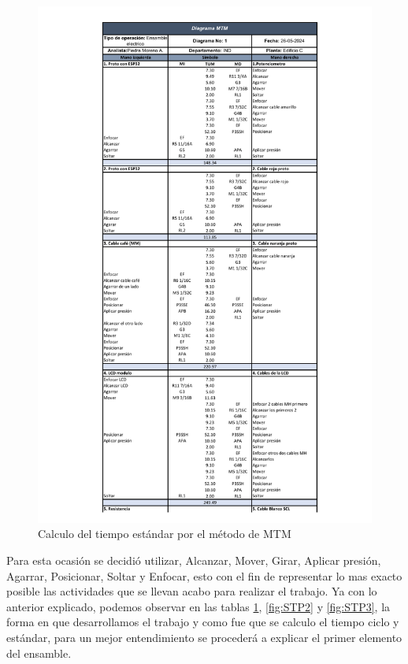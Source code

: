    \begin{figure}[H]
        \centering
        \includegraphics[trim = {20mm 1mm 20mm 1mm},clip,scale=0.3]{22/Img/tiempoEstandarSTP1.pdf}
        \caption{Calculo del tiempo estándar por el método de MTM}
        \label{fig:STP1}
    \end{figure}
    
    
     Para esta ocasión se decidió utilizar, Alcanzar, Mover, Girar, Aplicar presión, Agarrar, Posicionar, Soltar y Enfocar, esto con el fin de representar lo mas exacto posible las actividades que se llevan acabo para realizar el trabajo.
    Ya con lo anterior explicado, podemos observar en las tablas \ref{fig:STP1}, \ref{fig:STP2} y \ref{fig:STP3}, la forma en que desarrollamos el trabajo y como fue que se calculo el tiempo ciclo y estándar, para un mejor entendimiento se procederá a explicar el primer elemento del ensamble.
    
